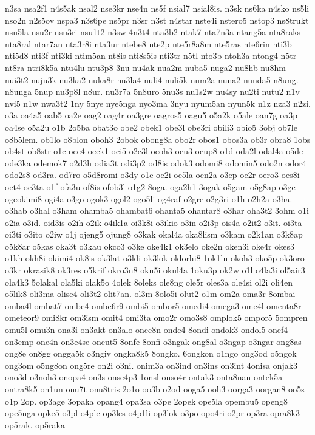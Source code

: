 {n3sa nsa2f1 n4s5ak nsal2 nse3kr nse4n ns5f nsial7 nsial8is. n3sk ns6ka
n4sko ns5li nso2n n2s5ov nspa3 n3s6pe ns5pr n3sr n3st n4star nste4i
nstero5 nstop3 ns8trukt nsu5la nsu2r nsu3ri nsu1t2 n3sw 4n3t4 nta3b2 ntak7
nta7n3a ntang5a nta8raks nta8ral ntar7an nta3r8i nta3ur ntebe8 nte2p
nte5r8a8m nte5ras nte6rin nti3b nti5d8 nti3f nti3ki ntim5an nt8is nti8s5is
nti3tr n5tl nto3b ntoh3a ntong4 n5tr nt8ra ntri8k5a ntu4lu ntu3p8 3nu
nu4ak nua2m nuba5 nuga2 nu8hb nu8hm nui3t2 nuju3k nu3ka2 nuka8r nu3la4
nuli4 nuli5k num2a nuna2 nunda5 n8ung. n8unga 5nup nu3p8l n8ur. nu3r7a
5n8uro 5nu3s nu1s2w nu4sy nu2ti nutu2 n1v nvi5 n1w nwa3t2 1ny 5nye nye5nga
nyo3ma 3nyu nyum5an nyun5k n1z nza3 n2zi. o3a oa4a5 oab5 oa2e oag2 oag4r
oa3gre oagros5 oagu5 o5a2k o5ale oan7g oa3p oa4se o5a2u o1b 2o5ba obat3o
obe2 obek1 obe3l obe3ri obili3 obio5 3obj ob7le o8b5lem. ob1lo o8blon
oboh3 2obok obong8a obo2r obos1 obos3a ob3r obra8 1obs ob4st ob8str o1c
oce4 ocek1 oci5 o2c3l ocoh3 ocu3 ocup8 o1d oda2l odal4a o5de ode3ka
odemok7 o2d3h odia3t odi3p2 od8is odok3 odomi8 odomin5 odo2n odor4 odo2s8
od3ra. od7ro o5d8romi o3dy o1e oe2i oe5la oen2a o3ep oe2r oero3 oes8i oet4
oe3ta o1f ofa3u of8is ofob3l o1g2 8oga. oga2h1 3ogak o5gam o5g8ap o3ge
ogeokimi8 ogi4a o3go ogok3 ogol2 ogo5li og4raf o2gre o2g3ri o1h o2h2a
o3ha. o3hab o3hal o3ham ohamba5 ohambat6 ohanta5 ohantar8 o3har oha3t2
3ohm o1i o2ia o3id. oid3is o2ih o2ik o4ik1a oi3k8i o3ikio o3in o2i3p ois4a
o2it2 o3it. oi3ta oi3ti o3ito o2iw o1j ojeng5 ojung8 o3kak okal4a oka8lism
o3kam o2k1an o3k8ap o5k8ar o5kas oka3t o3kau okco3 o3ke oke4k1 ok3elo
oke2n oken3i oke4r okes3 o1kh okh8i okimi4 ok8is ok3lat o3kli ok3lok
oklorhi8 1ok1lu okoh3 oko5p ok3oro o3kr okrasik8 ok3res o5krif okro3n8
oku5i okul4a 1oku3p ok2w o1l o4la3i ol5air3 ola4k3 5olakal ola5ki olak5o
4olek 8oleks ole8ng ole5r oles3a ole4si ol2i oli4en o5lik8 oli3ma olise4
oli3t2 olit7an. ol3m 8olo5i olut2 o1m om2a oma3r 8ombai omba4l ombat7
ombe4 ombe6r9 ombi5 ombor5 omedi4 omega3 ome4l omenta8r ometeor9 omi8kr
om3ism omit4 omi3ta omo2r omo3s8 omplok5 ompor5 5ompren omu5l omu3n ona3i
on3akt on3alo once8n onde4 8ondi ondok3 ondol5 onef4 on3emp one4n on3e4se
oneut5 8onfe 8onfi o3ngak ong8al o3ngap o3ngar ong8as ong8e on8gg ongga5k
o3ngiv ongka8k5 8ongko. 6ongkon o1ngo ong3od o5ngok ong3om o5ng8on ong5re
on2i o3ni. onim3a on3ind on3ins on3int 4onisa onjak3 ono3d o3noh3 onopa4
on3s onse4p3 1onsl onso4r ontak3 onta8nan ontek5a ontra8k5 on1un onu7t
onu8tris 2o1o oo3b o2od ooga5 ooh3 oorga3 oorgan8 oo5s o1p 2op. op3age
3opaka opang4 opa3sa o3pe 2opek ope5la opembu5 openg8 ope5nga opke5 o3pl
o4ple op3les o4p1li op3lok o3po opo4ri o2pr op3ra opra8k3 op5rak. op5raka
}
